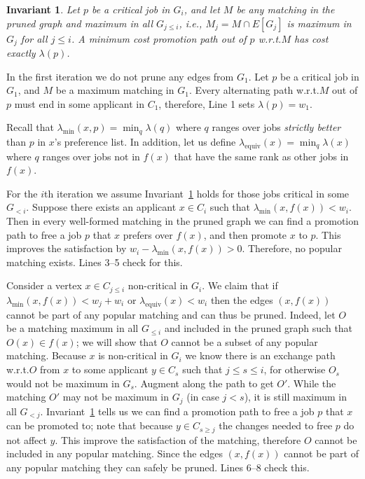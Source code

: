 \documentclass[11pt]{article}
\newcommand{\first}{f}
\newcommand{\minlabel}{\ensuremath{\lambda_{\mathrm{min}}}}
\newcommand{\equivlabel}{\ensuremath{\lambda_{\mathrm{equiv}}}}
\newcommand{\lab}{\ensuremath{\lambda}}
\newcommand{\wrt}{{w.r.t.}\xspace}
\newtheorem{invariant}{Invariant}
\begin{document}
\begin{invariant} \label{invariant:label-ties} Let $p$ be a critical job in $G_i$, and let $M$ be any matching in the pruned graph and maximum in all $G_{j\leq i}$, i.e., $M_j= M \cap E[G_j]$ is maximum in $G_j$ for all $j \leq i$. A minimum cost promotion path out of $p$ \wrt $M$ has cost exactly $\lab(p)$.
\end{invariant}

In the first iteration we do not prune any edges from $G_1$. Let $p$ be a critical job in $G_1$, and $M$ be a maximum matching in $G_1$. Every alternating path \wrt $M$ out of $p$ must end in some applicant in $C_1$, therefore, Line 1 sets $\lambda(p) = w_1$.

Recall that $\minlabel(x,p) = \min_q \lab(q)$ where $q$ ranges over jobs \emph{strictly better} than $p$ in $x$'s preference list. In addition, let us define $\equivlabel(x) = \min_q \lab(x)$ where $q$ ranges over jobs not in $\first(x)$ that have the same rank as other jobs in $\first(x)$.

For the $i$th iteration we assume Invariant~\ref{invariant:label-ties} holds for those jobs critical in some $G_{<i}$. Suppose there exists an applicant $x \in C_i$ such that $\minlabel(x, \first(x)) < w_i$. Then in every well-formed matching in the pruned graph we can find a promotion path to free a job $p$ that $x$ prefers over $\first(x)$, and then promote $x$ to $p$. This improves the satisfaction by $w_i - \minlabel(x, \first(x)) > 0$. Therefore, no popular matching exists. Lines 3--5 check for this.

Consider a vertex $x \in C_{j \leq i}$ non-critical in $G_i$. We claim that if $\minlabel(x, \first(x) )  < w_j + w_i$ or $\equivlabel(x) < w_i$ then the edges $(x,\first(x))$ cannot be part of any popular matching and can thus be pruned. Indeed, let $O$ be a matching maximum in all $G_{\leq i}$ and included in the pruned graph such that $O(x) \in \first(x)$; we will show that $O$ cannot be a subset of any popular matching. Because $x$ is non-critical in $G_i$ we know there is an exchange path \wrt $O$ from $x$ to some applicant $y \in C_{s}$ such that $j \leq s \leq i$, for otherwise $O_s$ would not be maximum in $G_s$. Augment along the path to get $O'$. While the matching $O'$ may not be maximum in $G_j$ (in case $j<s$), it is still maximum in all $G_{<j}$. Invariant~\ref{invariant:label-ties} tells us we can find a promotion path to free a job $p$ that $x$ can be promoted to; note that because $y \in C_{s\geq j}$ the changes needed to free $p$ do not affect $y$. This improve the satisfaction of the matching, therefore $O$ cannot be included in any popular matching. Since the edges $(x,f(x))$ cannot be part of any popular matching they can safely be pruned. Lines 6--8 check this.
\end{document}

